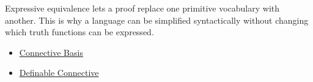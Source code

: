 \begin{remark*}[Interpretation]
Expressive equivalence lets a proof replace one primitive vocabulary with
another. This is why a language can be simplified syntactically without changing
which truth functions can be expressed.
\end{remark*}

\begin{dependencies}
\begin{itemize}
  \item \hyperref[def:connective-basis-propositional-logic]{Connective Basis}
  \item \hyperref[def:definable-connective-propositional-logic]{Definable Connective}
\end{itemize}
\end{dependencies}
